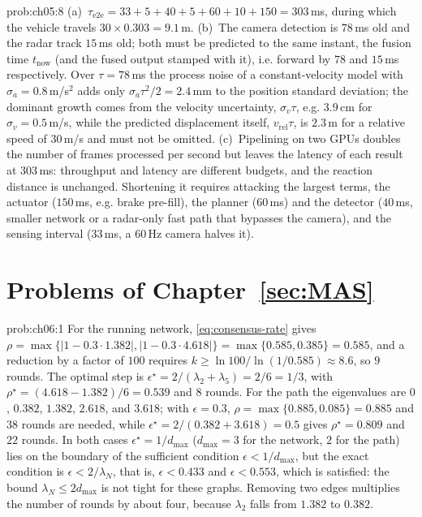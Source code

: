 \documentclass[graybox,envcountchap]{style/SNmono}
\begin{document}
\begin{sol}{prob:ch05:8}
(a)~$\tau_{\mathrm{e2e}}=33+5+40+5+60+10+150=303$\,ms, during which the vehicle travels $30\times0.303=9.1$\,m. (b)~The camera detection is $78$\,ms old and the radar track $15$\,ms old; both must be predicted to the same instant, the fusion time $t_{\mathrm{now}}$ (and the fused output stamped with it), i.e. forward by $78$ and $15$\,ms respectively. Over $\tau=78$\,ms the process noise of a constant-velocity model with $\sigma_{a}=0.8$\,m/s$^{2}$ adds only $\sigma_{a}\tau^{2}/2=2.4$\,mm to the position standard deviation; the dominant growth comes from the velocity uncertainty, $\sigma_{v}\tau$, e.g. $3.9$\,cm for $\sigma_{v}=0.5$\,m/s, while the predicted displacement itself, $v_{\mathrm{rel}}\tau$, is $2.3$\,m for a relative speed of $30$\,m/s and must not be omitted. (c)~Pipelining on two GPUs doubles the number of frames processed per second but leaves the latency of each result at $303$\,ms: throughput and latency are different budgets, and the reaction distance is unchanged. Shortening it requires attacking the largest terms, the actuator ($150$\,ms, e.g. brake pre-fill), the planner ($60$\,ms) and the detector ($40$\,ms, smaller network or a radar-only fast path that bypasses the camera), and the sensing interval ($33$\,ms, a $60$\,Hz camera halves it).
\end{sol}


\section*{Problems of Chapter~\ref{sec:MAS}}

\begin{sol}{prob:ch06:1}
For the running network, \eqref{eq:consensus-rate} gives $\rho=\max\{|1-0.3\cdot1.382|,|1-0.3\cdot4.618|\}=\max\{0.585,0.385\}=0.585$, and a reduction by a factor of $100$ requires $k\ge\ln 100/\ln(1/0.585)\approx8.6$, so $9$ rounds. The optimal step is $\epsilon^{\star}=2/(\lambda_2+\lambda_5)=2/6=1/3$, with $\rho^{\star}=(4.618-1.382)/6=0.539$ and $8$ rounds. For the path the eigenvalues are $0$, $0.382$, $1.382$, $2.618$, and $3.618$; with $\epsilon=0.3$, $\rho=\max\{0.885,0.085\}=0.885$ and $38$ rounds are needed, while $\epsilon^{\star}=2/(0.382+3.618)=0.5$ gives $\rho^{\star}=0.809$ and $22$ rounds. In both cases $\epsilon^{\star}=1/d_{\max}$ ($d_{\max}=3$ for the network, $2$ for the path) lies on the boundary of the sufficient condition $\epsilon<1/d_{\max}$, but the exact condition is $\epsilon<2/\lambda_N$, that is, $\epsilon<0.433$ and $\epsilon<0.553$, which is satisfied: the bound $\lambda_N\le2d_{\max}$ is not tight for these graphs. Removing two edges multiplies the number of rounds by about four, because $\lambda_2$ falls from $1.382$ to $0.382$.
\end{sol}
\end{document}
